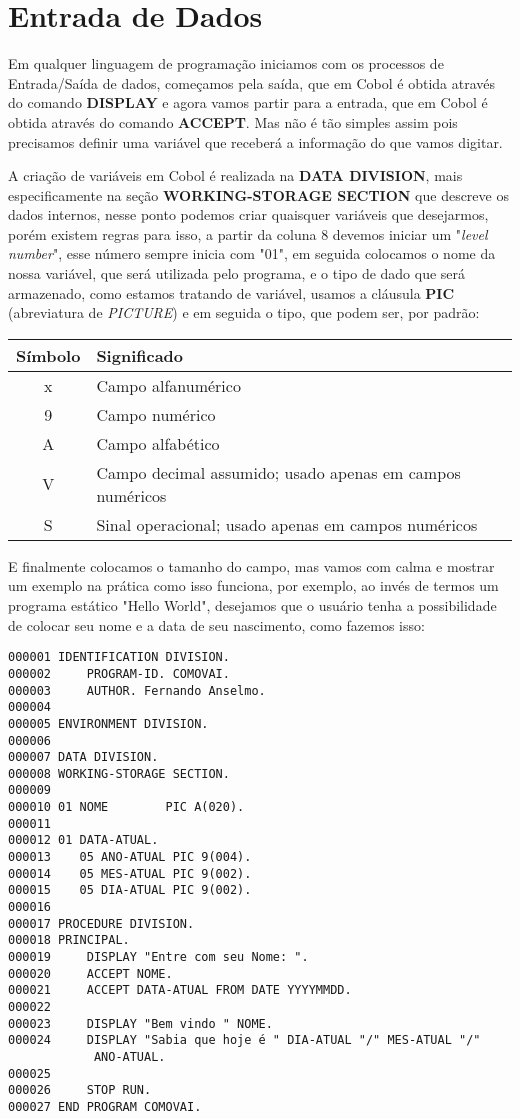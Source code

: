 \section{Entrada de Dados}
Em qualquer linguagem de programação iniciamos com os processos de Entrada/Saída de dados, começamos pela saída, que em Cobol é obtida através do comando \textbf{DISPLAY} e agora vamos partir para a entrada, que em Cobol é obtida através do comando \textbf{ACCEPT}. Mas não é tão simples assim pois precisamos definir uma variável que receberá a informação do que vamos digitar.

A criação de variáveis em Cobol é realizada na \textbf{DATA DIVISION}, mais especificamente na seção \textbf{WORKING-STORAGE SECTION} que descreve os dados internos, nesse ponto podemos criar quaisquer variáveis que desejarmos, porém existem regras para isso, a partir da coluna 8 devemos iniciar um "\textit{level number}", esse número sempre inicia com "01", em seguida colocamos o nome da nossa variável, que será utilizada pelo programa, e o tipo de dado que será armazenado, como estamos tratando de variável, usamos a cláusula \textbf{PIC} (abreviatura de \textit{PICTURE}) e em seguida o tipo, que podem ser, por padrão:

\begin{table}[H]
	\centering 
	\begin{tabular}{c | l }
		\textbf{Símbolo} & \textbf{Significado} \\ \hline
		x & Campo alfanumérico \\
		9 & Campo numérico \\
		A & Campo alfabético \\
		V & Campo decimal assumido; usado apenas em campos numéricos \\
		S & Sinal operacional; usado apenas em campos numéricos \\
	\end{tabular}
\end{table}

E finalmente colocamos o tamanho do campo, mas vamos com calma e mostrar um exemplo na prática como isso funciona, por exemplo, ao invés de termos um programa estático "Hello World", desejamos que o usuário tenha a possibilidade de colocar seu nome e a data de seu nascimento, como fazemos isso:
\begin{lstlisting}[]
000001 IDENTIFICATION DIVISION.
000002     PROGRAM-ID. COMOVAI.
000003     AUTHOR. Fernando Anselmo.
000004
000005 ENVIRONMENT DIVISION.
000006       
000007 DATA DIVISION.
000008 WORKING-STORAGE SECTION.
000009
000010 01 NOME        PIC A(020).
000011
000012 01 DATA-ATUAL.
000013    05 ANO-ATUAL PIC 9(004).
000014    05 MES-ATUAL PIC 9(002).
000015    05 DIA-ATUAL PIC 9(002).
000016
000017 PROCEDURE DIVISION.
000018 PRINCIPAL.
000019     DISPLAY "Entre com seu Nome: ".
000020     ACCEPT NOME.
000021     ACCEPT DATA-ATUAL FROM DATE YYYYMMDD.
000022
000023     DISPLAY "Bem vindo " NOME.
000024     DISPLAY "Sabia que hoje é " DIA-ATUAL "/" MES-ATUAL "/" 
            ANO-ATUAL.
000025
000026     STOP RUN.
000027 END PROGRAM COMOVAI.

\end{lstlisting}

